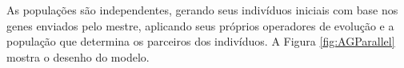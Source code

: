  As populações são independentes, gerando seus indivíduos iniciais com base nos genes enviados pelo mestre, aplicando seus próprios operadores de evolução e a população que determina os parceiros dos indivíduos.
 A Figura \ref{fig:AGParallel} mostra o desenho do modelo.
 
 \begin{minipage}{\linewidth}
 	\label{fig:AGParallel}
 \end{minipage}
 